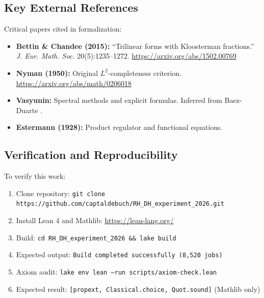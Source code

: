 \documentclass[11pt,a4paper]{article}
\theoremstyle{plain}
\theoremstyle{definition}
\theoremstyle{remark}
\begin{document}
\subsection{Key External References}

Critical papers cited in formalization:

\begin{itemize}[leftmargin=2em]
  \item \textbf{Bettin \& Chandee (2015):} ``Trilinear forms with Kloosterman fractions.'' \emph{J. Eur. Math. Soc.} 20(5):1235--1272. \url{https://arxiv.org/abs/1502.00769}
  \item \textbf{Nyman (1950):} Original $L^2$-completeness criterion. \url{https://arxiv.org/abs/math/0206018}
  \item \textbf{Vasyunin:} Spectral methods and explicit formulas. Inferred from Baez-Duarte \cite{BaezDuarte2003}.
  \item \textbf{Estermann (1928):} Product regulator and functional equations. \cite{Estermann1928}
\end{itemize}

\subsection{Verification and Reproducibility}

To verify this work:

\begin{enumerate}[label=\textbf{\arabic*.}]
  \item Clone repository: \texttt{git clone https://github.com/captaldebuch/RH_DH_experiment_2026.git}
  \item Install Lean 4 and Mathlib: \url{https://lean-lang.org/}
  \item Build: \texttt{cd RH_DH_experiment_2026 \&\& lake build}
  \item Expected output: \texttt{Build completed successfully (8,520 jobs)}
  \item Axiom audit: \texttt{lake env lean --run scripts/axiom-check.lean}
  \item Expected result: \texttt{[propext, Classical.choice, Quot.sound]} (Mathlib only)
\end{enumerate}
\end{document}
